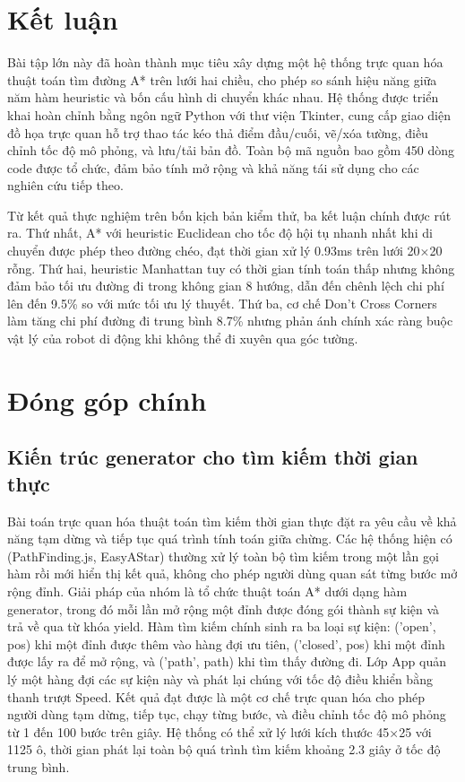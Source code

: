 \documentclass[../BTL.tex]{subfiles}
\begin{document}
\section{Kết luận}
\label{section:4.1}

Bài tập lớn này đã hoàn thành mục tiêu xây dựng một hệ thống trực quan hóa thuật toán tìm đường A* trên lưới hai chiều, cho phép so sánh hiệu năng giữa năm hàm heuristic và bốn cấu hình di chuyển khác nhau. Hệ thống được triển khai hoàn chỉnh bằng ngôn ngữ Python với thư viện Tkinter, cung cấp giao diện đồ họa trực quan hỗ trợ thao tác kéo thả điểm đầu/cuối, vẽ/xóa tường, điều chỉnh tốc độ mô phỏng, và lưu/tải bản đồ. Toàn bộ mã nguồn bao gồm 450 dòng code được tổ chức, đảm bảo tính mở rộng và khả năng tái sử dụng cho các nghiên cứu tiếp theo.

Từ kết quả thực nghiệm trên bốn kịch bản kiểm thử, ba kết luận chính được rút ra. Thứ nhất, A* với heuristic Euclidean cho tốc độ hội tụ nhanh nhất khi di chuyển được phép theo đường chéo, đạt thời gian xử lý 0.93ms trên lưới 20×20 rỗng. Thứ hai, heuristic Manhattan tuy có thời gian tính toán thấp nhưng không đảm bảo tối ưu đường đi trong không gian 8 hướng, dẫn đến chênh lệch chi phí lên đến 9.5\% so với mức tối ưu lý thuyết. Thứ ba, cơ chế Don't Cross Corners làm tăng chi phí đường đi trung bình 8.7\% nhưng phản ánh chính xác ràng buộc vật lý của robot di động khi không thể đi xuyên qua góc tường.

\section{Đóng góp chính}
\label{section:4.2}

\subsection{Kiến trúc generator cho tìm kiếm thời gian thực}
\label{section:4.2.1}

Bài toán trực quan hóa thuật toán tìm kiếm thời gian thực đặt ra yêu cầu về khả năng tạm dừng và tiếp tục quá trình tính toán giữa chừng. Các hệ thống hiện có (PathFinding.js, EasyAStar) thường xử lý toàn bộ tìm kiếm trong một lần gọi hàm rồi mới hiển thị kết quả, không cho phép người dùng quan sát từng bước mở rộng đỉnh. Giải pháp của nhóm là tổ chức thuật toán A* dưới dạng hàm generator, trong đó mỗi lần mở rộng một đỉnh được đóng gói thành sự kiện và trả về qua từ khóa yield. Hàm tìm kiếm chính sinh ra ba loại sự kiện: ('open', pos) khi một đỉnh được thêm vào hàng đợi ưu tiên, ('closed', pos) khi một đỉnh được lấy ra để mở rộng, và ('path', path) khi tìm thấy đường đi. Lớp App quản lý một hàng đợi các sự kiện này và phát lại chúng với tốc độ điều khiển bằng thanh trượt Speed. Kết quả đạt được là một cơ chế trực quan hóa cho phép người dùng tạm dừng, tiếp tục, chạy từng bước, và điều chỉnh tốc độ mô phỏng từ 1 đến 100 bước trên giây. Hệ thống có thể xử lý lưới kích thước 45×25 với 1125 ô, thời gian phát lại toàn bộ quá trình tìm kiếm khoảng 2.3 giây ở tốc độ trung bình.
\end{document}
